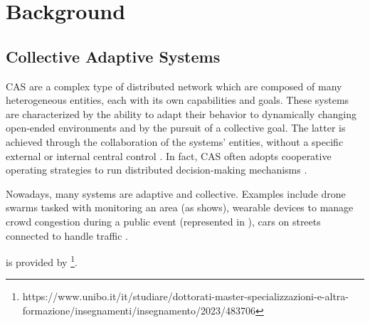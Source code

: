 \documentclass[12pt,a4paper,openright,twoside]{book}
\begin{document}
\chapter{Background}

\section{Collective Adaptive Systems}

\ac{CAS} are a complex type of distributed network which are composed of many heterogeneous entities, each with its own capabilities and goals. 
These systems are characterized by the ability to adapt their behavior to dynamically changing open-ended environments and by the pursuit of a collective goal. 
The latter is achieved through the collaboration of the systems’ entities, without a specific external or internal central control \cite{DBLP:series/lncs/HolzlRW08, DBLP:journals/corr/abs-1108-5643}. 
In fact, CAS often adopts cooperative operating strategies to run distributed decision-making mechanisms \cite{DBLP:journals/tomacs/Aldini18}.

Nowadays, many systems are adaptive and collective. Examples include drone swarms tasked with monitoring an area (as  shows),
wearable devices to manage crowd congestion during a public event (represented in ), cars on streets connected to handle traffic \cite{DBLP:journals/sttt/NicolaJW20}.

 is provided by \footnote{https://www.unibo.it/it/studiare/dottorati-master-specializzazioni-e-altra-formazione/insegnamenti/insegnamento/2023/483706}.
\end{document}
